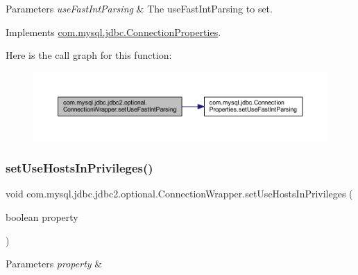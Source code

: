 \begin{DoxyParams}{Parameters}
{\em use\+Fast\+Int\+Parsing} & The use\+Fast\+Int\+Parsing to set. \\
\hline
\end{DoxyParams}


Implements \mbox{\hyperlink{interfacecom_1_1mysql_1_1jdbc_1_1_connection_properties_a64d13f1fe9290e34ad189fd0eb13b81d}{com.\+mysql.\+jdbc.\+Connection\+Properties}}.

Here is the call graph for this function\+:
\nopagebreak
\begin{figure}[H]
\begin{center}
\leavevmode
\includegraphics[width=350pt]{classcom_1_1mysql_1_1jdbc_1_1jdbc2_1_1optional_1_1_connection_wrapper_af424c555856eefbd0cad9ad2ffa0bf46_cgraph}
\end{center}
\end{figure}
\mbox{\label{classcom_1_1mysql_1_1jdbc_1_1jdbc2_1_1optional_1_1_connection_wrapper_a5d5646bf3f93b51fcf264bec6c2aacf1}} 
\subsubsection{\texorpdfstring{set\+Use\+Hosts\+In\+Privileges()}{setUseHostsInPrivileges()}}
{\footnotesize\ttfamily void com.\+mysql.\+jdbc.\+jdbc2.\+optional.\+Connection\+Wrapper.\+set\+Use\+Hosts\+In\+Privileges (\begin{DoxyParamCaption}\item[{boolean}]{property }\end{DoxyParamCaption})}


\begin{DoxyParams}{Parameters}
{\em property} & \\
\hline
\end{DoxyParams}


